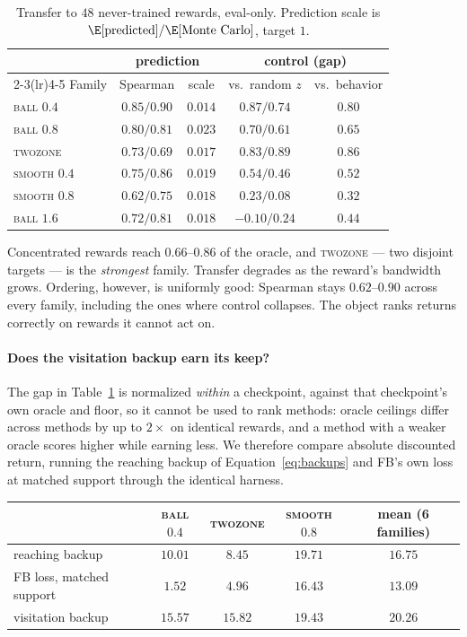 \begin{table}[t]
\centering\footnotesize
\begin{tabular}{l c c c c}
\toprule
& \multicolumn{2}{c}{prediction} & \multicolumn{2}{c}{control (gap)} \\
\cmidrule(lr){2-3}\cmidrule(lr){4-5}
Family & Spearman & scale & vs.\ random $z$ & vs.\ behavior \\
\midrule
\textsc{ball} $0.4$   & $0.85/0.90$ & $0.014$ & $0.87/0.74$ & $0.80$ \\
\textsc{ball} $0.8$   & $0.80/0.81$ & $0.023$ & $0.70/0.61$ & $0.65$ \\
\textsc{twozone}      & $0.73/0.69$ & $0.017$ & $\mathbf{0.83/0.89}$ & $\mathbf{0.86}$ \\
\textsc{smooth} $0.4$ & $0.75/0.86$ & $0.019$ & $0.54/0.46$ & $0.52$ \\
\textsc{smooth} $0.8$ & $0.62/0.75$ & $0.018$ & $0.23/0.08$ & $0.32$ \\
\textsc{ball} $1.6$   & $0.72/0.81$ & $0.018$ & $-0.10/0.24$ & $0.44$ \\
\bottomrule
\end{tabular}
\caption{Transfer to $48$ never-trained rewards, eval-only. Prediction scale is
$\E[\text{predicted}]/\E[\text{Monte Carlo}]$, target $1$.}
\label{tab:l2}
\end{table}

Concentrated rewards reach $0.66$--$0.86$ of the oracle, and \textsc{twozone} ---
two disjoint targets --- is the \emph{strongest} family. Transfer degrades as the
reward's bandwidth grows. Ordering, however, is uniformly good: Spearman stays
$0.62$--$0.90$ across every family, including the ones where control collapses.
The object ranks returns correctly on rewards it cannot act on.

\paragraph{Does the visitation backup earn its keep?}
The gap in Table~\ref{tab:l2} is normalized \emph{within} a checkpoint, against
that checkpoint's own oracle and floor, so it cannot be used to rank methods:
oracle ceilings differ across methods by up to $2\times$ on identical rewards, and
a method with a weaker oracle scores higher while earning less. We therefore
compare absolute discounted return, running the reaching backup of
Equation~\ref{eq:backups} and FB's own loss at matched support through the
identical harness.

\begin{center}\footnotesize
\begin{tabular}{l c c c c}
\toprule
& \textsc{ball} $0.4$ & \textsc{twozone} & \textsc{smooth} $0.8$ & mean (6 families) \\
\midrule
reaching backup       & $10.01$ & $8.45$  & $19.71$ & $16.75$ \\
FB loss, matched support & $1.52$ & $4.96$ & $16.43$ & $13.09$ \\
visitation backup     & $\mathbf{15.57}$ & $\mathbf{15.82}$ & $19.43$ & $\mathbf{20.26}$ \\
\bottomrule
\end{tabular}
\end{center}

